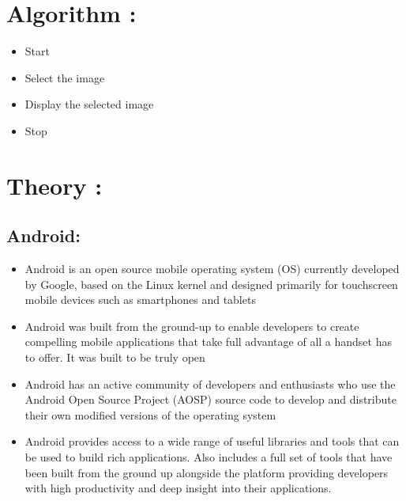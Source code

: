\documentclass{article}
\begin{document}
\section{Algorithm : }
	\begin{itemize}
		\item Start
        \item Select the image
        \item Display the selected image
        \item Stop
	\end{itemize}


\section{Theory : }
 	
\subsection{Android:}
	\begin{itemize}
		\item Android is an open source mobile operating system (OS) currently developed by Google, based on the Linux kernel and designed primarily for touchscreen mobile devices such as smartphones and tablets
        \item Android was built from the ground-up to enable developers to create compelling mobile applications that take full advantage of all a handset has to offer. It was built to be truly open
        \item Android has an active community of developers and enthusiasts who use the Android Open Source Project (AOSP) source code to develop and distribute their own modified versions of the operating system
        \item Android provides access to a wide range of useful libraries and tools that can be used to build rich applications. Also includes a full set of tools that have been built from the ground up alongside the platform providing developers with high productivity and deep insight into their applications.
	\end{itemize}
\end{document}
